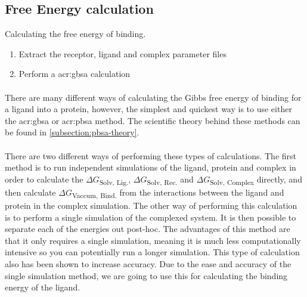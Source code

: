 \subsection{Free Energy calculation}
    \begin{task}[label=task:Energy]{Calculating the free energy of binding.}
        \begin{enumerate}[label=(\alph*)]
            \item Extract the receptor, ligand and complex parameter files
            \item Perform a \gls{acr:gbsa} calculation
        \end{enumerate}
    \end{task}

    \paragraph{}
    There are many different ways of calculating the Gibbs free energy of binding for a ligand into a protein\cite{Cournia2017RelativeConsiderations, Genheden2012ComparisonEnergies, Singh2010AbsoluteInteractions, P.Bhati2016RapidIntegration, Wang2019End-PointDesign}, however, the simplest and quickest way is to use either the \gls{acr:gbsa} or \gls{acr:pbsa} method.\cite{Wang2019End-PointDesign} The scientific theory behind these methods can be found in \cref{subsection:pbsa-theory}.

    \paragraph{}
    There are two different ways of performing these types of calculations. The first method is to run independent simulations of the ligand, protein and complex in order to calculate the $\Delta G$\textsubscript{Solv, Lig.}, $\Delta G$\textsubscript{Solv, Rec.} and $\Delta G$\textsubscript{Solv, Complex} directly, and then calculate $\Delta G$\textsubscript{Vaccum, Bind.} from the interactions between the ligand and protein in the complex simulation. The other way of performing this calculation is to perform a single simulation of the complexed system. It is then possible to separate each of the energies out post-hoc. The advantages of this method are that it only requires a single simulation, meaning it is much less computationally intensive so you can potentially run a longer simulation. This type of calculation also has been shown to increase accuracy. Due to the ease and accuracy of the single simulation method, we are going to use this for calculating the binding energy of the ligand. 

